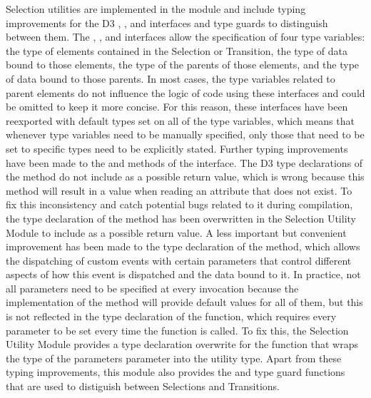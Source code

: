 Selection utilities are implemented in the
 module and include typing improvements
for the D3 , , and
 interfaces and type guards to distinguish
between them.  The , , and
 interfaces allow the specification of
four type variables: the type of elements contained in the Selection
or Transition, the type of data bound to those elements, the type of
the parents of those elements, and the type of data bound to those
parents.  In most cases, the type variables related to parent elements
do not influence the logic of code using these interfaces and could be
omitted to keep it more concise.  For this reason, these interfaces
have been reexported with default types set on all of the type
variables, which means that whenever type variables need to be
manually specified, only those that need to be set to specific types
need to be explicitly stated.  Further typing improvements have been
made to the  and  methods of the
 interface.  The D3 type declarations of the
 method do not include  as a possible
return value, which is wrong because this method will result in a
 value when reading an attribute that does not exist.  To
fix this inconsistency and catch potential bugs related to it during
compilation, the type declaration of the  method
has been overwritten in the Selection Utility Module to include
 as a possible return value.  A less important but
convenient improvement has been made to the type declaration of the
 method, which allows the dispatching of
custom events with certain parameters that control different aspects
of how this event is dispatched and the data bound to it.  In
practice, not all parameters need to be specified at every invocation
because the implementation of the  method
will provide default values for all of them, but this is not reflected
in the type declaration of the function, which requires every
parameter to be set every time the function is called.  To fix this,
the Selection Utility Module provides a type declaration overwrite for
the  function that wraps the type of the
parameters parameter into the  utility type.  Apart from
these typing improvements, this module also provides the
 and  type guard functions that
are used to distiguish between Selections and Transitions.


